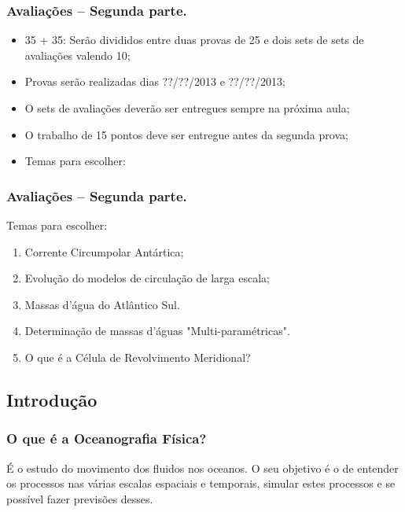 \begin{frame}
    \frametitle{Avaliações -- Segunda parte.}
    \begin{itemize}[<+-| alert@+>]
        \item 35 + 35: Serão divididos entre duas provas de 25 e dois sets de sets de avaliações valendo 10;
        \item Provas serão realizadas dias ??/??/2013 e ??/??/2013;
        \item O sets de avaliações deverão ser entregues sempre na próxima aula;
        \item O trabalho de 15 pontos deve ser entregue antes da segunda prova;
        \item Temas para escolher:
    \end{itemize}
\end{frame}

\begin{frame}
    \frametitle{Avaliações -- Segunda parte.}
        \begin{block}{}
        Temas para escolher:
        \end{block}
            {\scriptsize
            \begin{enumerate}[<+-| alert@+>]
                \item Corrente Circumpolar Antártica;
                \item Evolução do modelos de circulação de larga escala;
                \item Massas d'água do Atlântico Sul.
                \item Determinação de massas d'águas "Multi-paramétricas".
                \item O que é a Célula de Revolvimento Meridional?
            \end{enumerate}
            }
\end{frame}

\subsection{Introdução}
\begin{frame}
    \frametitle{O que é a Oceanografia Física?}
    \begin{block}{}
        É o estudo do movimento dos fluidos nos oceanos.  O seu objetivo é o de
        entender os processos nas várias escalas espaciais e temporais, simular
        estes processos e se possível fazer previsões desses.
    \end{block}
\end{frame}

